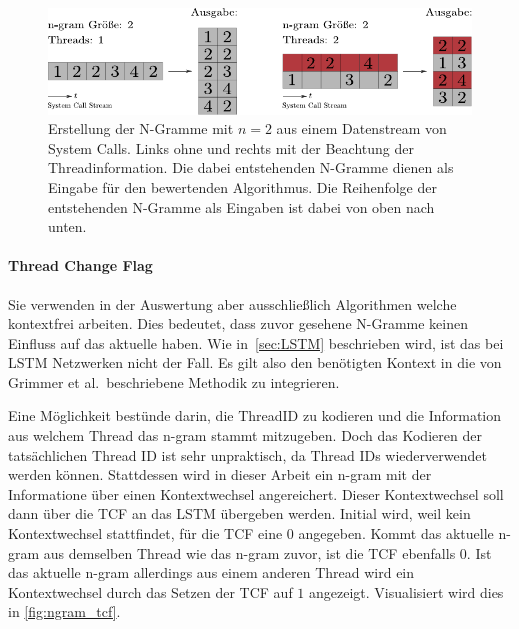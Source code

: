                 \begin{figure}
                    \includegraphics[width=\textwidth]{images/ngram.pdf}
                    \caption[Erstellung N-Gramme]{Erstellung der N-Gramme mit $n=2$ aus einem Datenstream von System Calls.
                        Links ohne und rechts mit der Beachtung der Threadinformation.
                        Die dabei entstehenden N-Gramme dienen als Eingabe für den bewertenden Algorithmus.
                        Die Reihenfolge der entstehenden N-Gramme als Eingaben ist dabei von oben nach unten.
                    }\label{fig:ngram_thread}
                \end{figure}

            \paragraph{Thread Change Flag}
                Sie verwenden in der Auswertung aber ausschließlich Algorithmen welche kontextfrei arbeiten.
                Dies bedeutet, dass zuvor gesehene N-Gramme keinen Einfluss auf das aktuelle haben.
                Wie in~\autoref{sec:LSTM} beschrieben wird, ist das bei \ac{LSTM} Netzwerken nicht der Fall.
                Es gilt also den benötigten Kontext in die von Grimmer et al.\ beschriebene Methodik zu integrieren.

                Eine Möglichkeit bestünde darin, die ThreadID zu kodieren und die Information aus welchem Thread das n-gram stammt mitzugeben.
                Doch das Kodieren der tatsächlichen Thread ID ist sehr unpraktisch, da Thread IDs wiederverwendet werden können.
                Stattdessen wird in dieser Arbeit ein n-gram mit der Informatione über einen Kontextwechsel angereichert. 
                Dieser Kontextwechsel soll dann über die \ac{TCF} an das \ac{LSTM} übergeben werden.
                Initial wird, weil kein Kontextwechsel stattfindet, für die \ac{TCF} eine $0$ angegeben.
                Kommt das aktuelle n-gram aus demselben Thread wie das n-gram zuvor, ist die \ac{TCF} ebenfalls $0$.
                Ist das aktuelle n-gram allerdings aus einem anderen Thread wird ein Kontextwechsel durch das Setzen der \ac{TCF} auf $1$ angezeigt.
                Visualisiert wird dies in \autoref{fig:ngram_tcf}.

